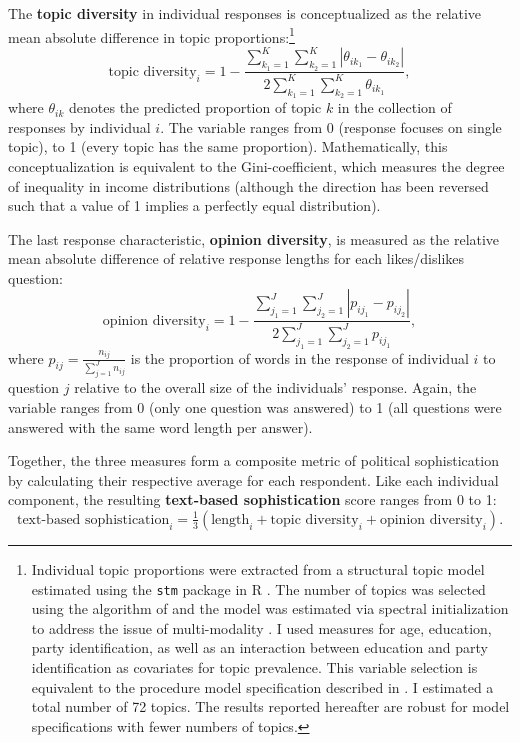 \documentclass[12pt]{article}
\begin{document}
The \textbf{topic diversity} in individual responses is conceptualized as the relative mean absolute difference in topic proportions:\footnote{Individual topic proportions were extracted from a structural topic model estimated using the \texttt{stm} package in R \citep{roberts2014structural}. The number of topics was selected using the algorithm of \citet{lee2014low} and the model was estimated via spectral initialization to address the issue of multi-modality \citep[see][for details]{roberts2014stm}. I used measures for age, education, party identification, as well as an interaction between education and party identification as covariates for topic prevalence. This variable selection is equivalent to the procedure model specification described in \citet{roberts2014structural}. I estimated a total number of 72 topics. The results reported hereafter are robust for model specifications with fewer numbers of topics.}
\begin{equation}
\text{topic diversity}_i = 1-\dfrac{\sum_{k_1=1}^K\sum_{k_2=1}^K |\theta_{ik_1} - \theta_{ik_2}|}{2\sum_{k_1=1}^K\sum_{k_2=1}^K \theta_{ik_1}},
\end{equation}
where $\theta_{ik}$ denotes the predicted proportion of topic $k$ in the collection of responses by individual $i$. The variable ranges from 0 (response focuses on single topic), to 1 (every topic has the same proportion). Mathematically, this conceptualization is equivalent to the Gini-coefficient, which measures the degree of inequality in income distributions (although the direction has been reversed such that a value of 1 implies a perfectly equal distribution).

The last response characteristic, \textbf{opinion diversity}, is measured as the relative mean absolute difference of relative response lengths for each
likes/dislikes question:
\begin{equation}
\text{opinion diversity}_i = 1-\dfrac{\sum_{j_1=1}^J\sum_{j_2=1}^J |p_{ij_1} - p_{ij_2}|}{2\sum_{j_1=1}^J\sum_{j_2=1}^J p_{ij_1}},
\end{equation}
where $p_{ij}=\tfrac{n_{ij}}{\sum_{j=1}^J n_{ij}}$ is the proportion of words in the response of individual $i$ to question $j$ relative to the overall size of the individuals' response. Again, the variable ranges from 0 (only one question was answered) to 1 (all questions were answered with the same word length per answer).

Together, the three measures form a composite metric of political sophistication by calculating their respective average for each respondent. Like each individual component, the resulting \textbf{text-based sophistication} score ranges from 0 to 1:
\begin{equation}
\text{text-based sophistication}_i = \tfrac{1}{3}(\text{length}_i + \text{topic diversity}_i + \text{opinion diversity}_i).
\end{equation}
\end{document}

